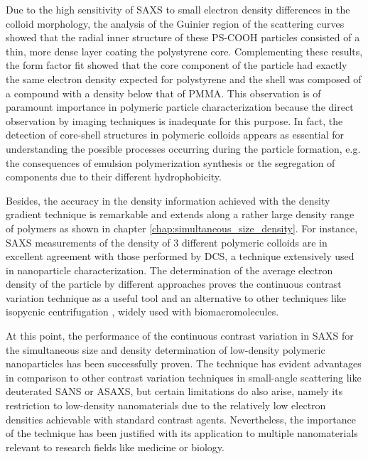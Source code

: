 Due to the high sensitivity of SAXS to small electron density differences in the colloid morphology, the analysis of the Guinier region of the scattering curves showed that the radial inner structure of these PS-COOH particles consisted of a thin, more dense layer coating the polystyrene core. Complementing these results, the form factor fit showed that the core component of the particle had exactly the same electron  density expected for polystyrene and the shell was composed of a compound with a density below that of PMMA. This observation is of paramount importance in polymeric particle characterization because the direct observation by imaging techniques is inadequate for this purpose. In fact, the detection of core-shell structures in polymeric colloids appears as essential for understanding the possible processes occurring during the particle formation, e.g. the consequences of emulsion polymerization synthesis or the segregation of components due to their different hydrophobicity.

Besides, the accuracy in the density information achieved with the density gradient technique is remarkable and extends along a rather large density range of polymers as shown in chapter \ref{chap:simultaneous_size_density}. For instance, SAXS measurements of the density of 3 different polymeric colloids are in excellent agreement with those performed by DCS, a technique extensively used in nanoparticle characterization. The determination of the average electron density of the particle by different approaches proves the continuous contrast variation technique as a useful tool and an alternative to other techniques like isopycnic centrifugation \citep{vauthier_measurement_1999,arnold_sorting_2006,sun_separation_2009}, widely used with biomacromolecules. 

At this point, the performance of the continuous contrast variation in SAXS for the simultaneous size and density determination of low-density polymeric nanoparticles has been successfully proven. The technique has evident advantages in comparison to other contrast variation techniques in small-angle scattering like deuterated SANS or ASAXS, but certain limitations do also arise, namely its restriction to low-density nanomaterials due to the relatively low electron densities achievable with standard contrast agents. Nevertheless, the importance of the technique has been justified with its application to multiple nanomaterials relevant to research fields like medicine or biology.


